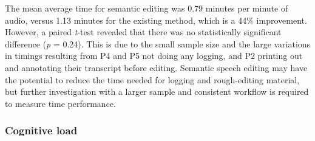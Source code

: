 The mean average time for semantic editing was 0.79 minutes per minute of audio, versus 1.13 minutes for the existing
method, which is a 44\% improvement. However, a paired \textit{t}-test revealed that there was no statistically
significant difference (\textit{p} = 0.24).  This is due to the small sample size and the large variations in timings
resulting from P4 and P5 not doing any logging, and P2 printing out and annotating their transcript before editing.
Semantic speech editing may have the potential to reduce the time needed for logging and rough-editing material, but
further investigation with a larger sample and consistent workflow is required to measure time performance.




\subsubsection{Cognitive load}



